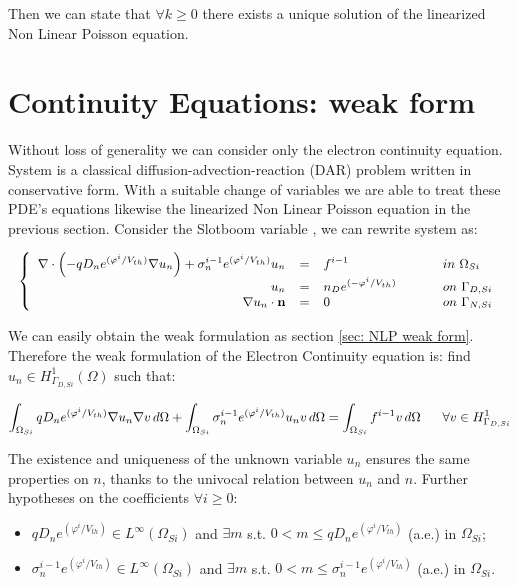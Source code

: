 Then we can state that $\forall k \geq 0$ there exists a unique solution of the linearized Non Linear Poisson equation.

\section{Continuity Equations: weak form}

Without loss of generality we can consider only the electron continuity equation. System  is a classical diffusion-advection-reaction (DAR) problem written in conservative form. With a suitable change of variables we are able to treat these PDE's equations likewise the linearized Non Linear Poisson equation in the previous section. Consider the Slotboom variable , we can rewrite system  as:

\begin{equation}
\label{eq: system continuity equation}
\small
\left\{
\begin{array}{rcll}
 \nabla \cdot \left( - q D_n e^{(\varphi^{i}/V_{th})}\nabla u_n \right) + \sigma_n^{i-1} e^{(\varphi^{i}/V_{th})} u_n& = & f^{i-1}  & \psp{15} in \psp{2} \Omega_{Si} \\
u_n & = &  n_D e^{(-\varphi^{i}/V_{th})} & \psp{15} on \psp{2} \Gamma_{D,Si} \\
\nabla u_n \cdot \vect{n} & = & 0 & \psp{15} on \psp{2} \Gamma_{N,Si}
\end{array}
\right.
\end{equation}

We can easily obtain the weak formulation as section \ref{sec: NLP weak form}. Therefore the weak formulation of the Electron Continuity equation is: find $u_n \in H^1_{\Gamma_{D,Si}}(\Omega)$ such that:

\begin{equation}
\footnotesize
\label{eq: LEC weakformulation}
\int_{\Omega_{Si}}  q D_n e^{(\varphi^{i}/V_{th})} \nabla u_n \nabla v \, d\Omega + \int_{\Omega_{Si}} \sigma_n^{i-1} e^{(\varphi^{i}/V_{th})} u_n v \, d\Omega = \int_{\Omega_{Si}} f^{i-1}v \, d\Omega \psp{10} \forall v \in H^1_{\Gamma_{D,Si}}
\end{equation}


The existence and uniqueness of the unknown variable $u_n$ ensures the same properties on $n$, thanks to the univocal relation between $u_n$ and $n$.
Further hypotheses on the coefficients $\forall i\geq 0$:
\begin{itemize}
\item $q D_n e^{(\varphi^{i}/V_{th})} \in L^{\infty}(\Omega_{Si})$ and $\exists m$ s.t. $0 < m \leq q D_n e^{(\varphi^{i}/V_{th})}$ (a.e.) in $\Omega_{Si}$;
\item  $\sigma_n^{i-1} e^{(\varphi^{i}/V_{th})} \in L^{\infty}(\Omega_{Si})$ and $\exists m$ s.t. $0 < m \leq \sigma_n^{i-1} e^{(\varphi^{i}/V_{th})}$ (a.e.) in $\Omega_{Si}$.
\end{itemize}

